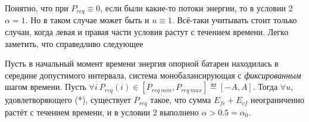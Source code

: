 
Понятно, что при $P_{req} \equiv 0$, если были какие-то потоки энергии, то в условии 2 $\alpha = 1$. 
Но в таком случае может быть и $u \equiv 1 $. 
Всё-таки учитывать стоит только случаи, когда левая и правая части условия растут с течением времени.
Легко заметить, что справедливо следующее
\begin{Statement}
Пусть в начальный момент времени энергия опорной батареи находилась в середине допустимого интервала, система монобалансирующая с \textit{фиксированным} шагом времени.
Пусть $\forall i ~P_{req}(i) \in [P_{req~min}, P_{req~max}] \eqdef [-A, A]$. 
Тогда $\forall u$, удовлетворяющего (*), существует $P_{req}$ такое, что сумма $E_{fc} + E_{cf}$ неограниченно растёт с течением времени, и в условии 2 выполнено $\alpha > 0.5 = \alpha_0$.
\end{Statement}


